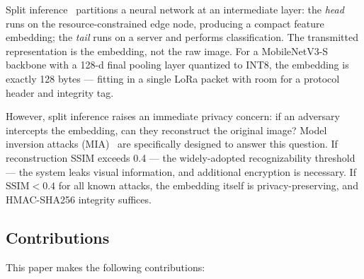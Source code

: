 \documentclass[journal]{IEEEtran}
\newcommand{\ssim}{\mathrm{SSIM}}
\newcommand{\MN}{MobileNetV3-S\xspace}
\begin{document}
Split inference~\cite{Matsubara2022} partitions a neural network at an
intermediate layer: the \emph{head} runs on the resource-constrained
edge node, producing a compact feature embedding; the \emph{tail} runs
on a server and performs classification.
The transmitted representation is the embedding, not the raw image.
For a \MN backbone with a 128-d final pooling layer quantized to INT8,
the embedding is exactly 128 bytes --- fitting in a single LoRa packet
with room for a protocol header and integrity tag.

However, split inference raises an immediate privacy concern: if an
adversary intercepts the embedding, can they reconstruct the original image?
Model inversion attacks (MIA)~\cite{Fredrikson2015,Zhu2019,Yang2019}
are specifically designed to answer this question.
If reconstruction SSIM exceeds 0.4 --- the widely-adopted
recognizability threshold~\cite{Wang2004} --- the system leaks
visual information, and additional encryption is necessary.
If $\ssim < 0.4$ for all known attacks, the embedding itself is
privacy-preserving, and HMAC-SHA256 integrity suffices.

\subsection{Contributions}

This paper makes the following contributions:
\end{document}
